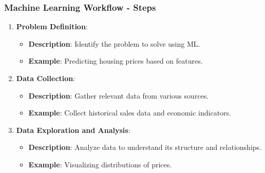 \documentclass[aspectratio=169]{beamer}
\begin{document}
\begin{frame}[fragile]
    \frametitle{Machine Learning Workflow - Steps}
    \begin{enumerate}
        \item \textbf{Problem Definition}:
        \begin{itemize}
            \item \textbf{Description}: Identify the problem to solve using ML.
            \item \textbf{Example}: Predicting housing prices based on features.
        \end{itemize}
        
        \item \textbf{Data Collection}:
        \begin{itemize}
            \item \textbf{Description}: Gather relevant data from various sources.
            \item \textbf{Example}: Collect historical sales data and economic indicators.
        \end{itemize}
        
        \item \textbf{Data Exploration and Analysis}:
        \begin{itemize}
            \item \textbf{Description}: Analyze data to understand its structure and relationships.
            \item \textbf{Example}: Visualizing distributions of prices.
        \end{itemize}
    \end{enumerate}
\end{frame}
\end{document}
